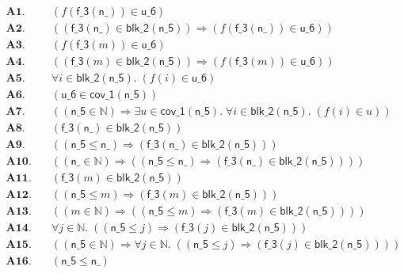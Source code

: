 \documentclass[11pt]{article}
\begin{document}
\begin{align*}
  \mathbf{A1.}\quad & (f(\mathsf{f\_3}(\mathsf{n\_})) \in \mathsf{u\_6}) \\
  \mathbf{A2.}\quad & ((\mathsf{f\_3}(\mathsf{n\_}) \in \mathsf{blk\_2}(\mathsf{n\_5})) \Rightarrow (f(\mathsf{f\_3}(\mathsf{n\_})) \in \mathsf{u\_6})) \\
  \mathbf{A3.}\quad & (f(\mathsf{f\_3}(m)) \in \mathsf{u\_6}) \\
  \mathbf{A4.}\quad & ((\mathsf{f\_3}(m) \in \mathsf{blk\_2}(\mathsf{n\_5})) \Rightarrow (f(\mathsf{f\_3}(m)) \in \mathsf{u\_6})) \\
  \mathbf{A5.}\quad & \forall i \in \mathsf{blk\_2}(\mathsf{n\_5}).\; (f(i) \in \mathsf{u\_6}) \\
  \mathbf{A6.}\quad & (\mathsf{u\_6} \in \mathsf{cov\_1}(\mathsf{n\_5})) \\
  \mathbf{A7.}\quad & ((\mathsf{n\_5} \in \mathbb{N}) \Rightarrow \exists u \in \mathsf{cov\_1}(\mathsf{n\_5}).\; \forall i \in \mathsf{blk\_2}(\mathsf{n\_5}).\; (f(i) \in u)) \\
  \mathbf{A8.}\quad & (\mathsf{f\_3}(\mathsf{n\_}) \in \mathsf{blk\_2}(\mathsf{n\_5})) \\
  \mathbf{A9.}\quad & ((\mathsf{n\_5} \leq \mathsf{n\_}) \Rightarrow (\mathsf{f\_3}(\mathsf{n\_}) \in \mathsf{blk\_2}(\mathsf{n\_5}))) \\
  \mathbf{A10.}\quad & ((\mathsf{n\_} \in \mathbb{N}) \Rightarrow ((\mathsf{n\_5} \leq \mathsf{n\_}) \Rightarrow (\mathsf{f\_3}(\mathsf{n\_}) \in \mathsf{blk\_2}(\mathsf{n\_5})))) \\
  \mathbf{A11.}\quad & (\mathsf{f\_3}(m) \in \mathsf{blk\_2}(\mathsf{n\_5})) \\
  \mathbf{A12.}\quad & ((\mathsf{n\_5} \leq m) \Rightarrow (\mathsf{f\_3}(m) \in \mathsf{blk\_2}(\mathsf{n\_5}))) \\
  \mathbf{A13.}\quad & ((m \in \mathbb{N}) \Rightarrow ((\mathsf{n\_5} \leq m) \Rightarrow (\mathsf{f\_3}(m) \in \mathsf{blk\_2}(\mathsf{n\_5})))) \\
  \mathbf{A14.}\quad & \forall j \in \mathbb{N}.\; ((\mathsf{n\_5} \leq j) \Rightarrow (\mathsf{f\_3}(j) \in \mathsf{blk\_2}(\mathsf{n\_5}))) \\
  \mathbf{A15.}\quad & ((\mathsf{n\_5} \in \mathbb{N}) \Rightarrow \forall j \in \mathbb{N}.\; ((\mathsf{n\_5} \leq j) \Rightarrow (\mathsf{f\_3}(j) \in \mathsf{blk\_2}(\mathsf{n\_5})))) \\
  \mathbf{A16.}\quad & (\mathsf{n\_5} \leq \mathsf{n\_}) \\

\end{align*}
\end{document}
